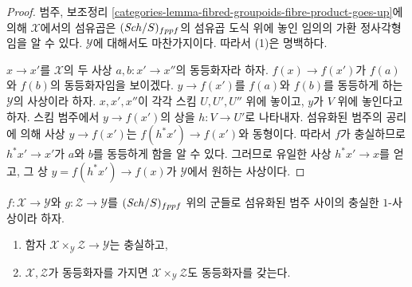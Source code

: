 \begin{proof}
범주, 보조정리
\ref{categories-lemma-fibred-groupoids-fibre-product-goes-up}에 의해
$\mathcal{X}$에서의 섬유곱은 $(\mathit{Sch}/S)_{fppf}$의 섬유곱 도식
위에 놓인 임의의 가환 정사각형임을 알 수 있다.
$\mathcal{Y}$에 대해서도 마찬가지이다. 따라서 (1)은 명백하다.

\medskip\noindent
$x \to x'$를 $\mathcal{X}$의 두 사상 $a, b : x' \to x''$의
동등화자라 하자. $f(x) \to f(x')$가 $f(a)$와 $f(b)$의
동등화자임을 보이겠다. $y \to f(x')$를 $f(a)$와 $f(b)$를
동등하게 하는 $\mathcal{Y}$의 사상이라 하자.
$x, x', x''$이 각각 스킴 $U, U', U''$ 위에 놓이고,
$y$가 $V$ 위에 놓인다고 하자.
스킴 범주에서 $y \to f(x')$의 상을 $h : V \to U'$로 나타내자.
섬유화된 범주의 공리에 의해 사상 $y \to f(x')$는
$f(h^*x') \to f(x')$와 동형이다. 따라서 $f$가 충실하므로
$h^*x' \to x'$가 $a$와 $b$를 동등하게 함을 알 수 있다.
그러므로 유일한 사상 $h^*x' \to x$를 얻고, 그 상
$y = f(h^*x') \to f(x)$가 $\mathcal{Y}$에서 원하는 사상이다.
\end{proof}

\begin{lemma}
\label{lemma-fibre-products-preserve-properties}
$f : \mathcal{X} \to \mathcal{Y}$와
$g : \mathcal{Z} \to \mathcal{Y}$를 $(\mathit{Sch}/S)_{fppf}$ 위의
군들로 섬유화된 범주 사이의 충실한 $1$-사상이라 하자.
\begin{enumerate}
\item 함자 $\mathcal{X} \times_\mathcal{Y} \mathcal{Z} \to \mathcal{Y}$는
충실하고,
\item $\mathcal{X}, \mathcal{Z}$가 동등화자를 가지면
$\mathcal{X} \times_\mathcal{Y} \mathcal{Z}$도 동등화자를 갖는다.
\end{enumerate}
\end{lemma}

